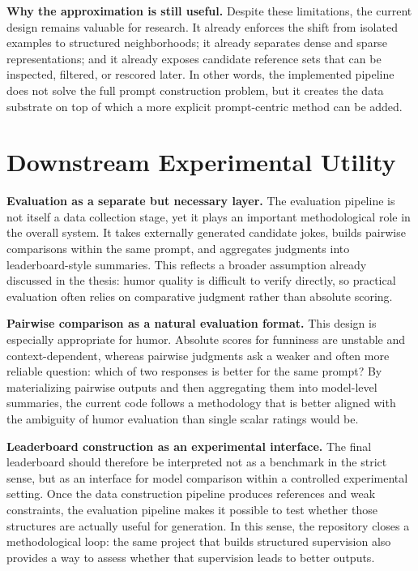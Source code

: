 \documentclass[12pt]{extarticle}
\begin{document}
\textbf{Why the approximation is still useful.} Despite these limitations, the current design remains valuable for research. It already enforces the shift from isolated examples to structured neighborhoods; it already separates dense and sparse representations; and it already exposes candidate reference sets that can be inspected, filtered, or rescored later. In other words, the implemented pipeline does not solve the full prompt construction problem, but it creates the data substrate on top of which a more explicit prompt-centric method can be added.

\section{Downstream Experimental Utility}

\textbf{Evaluation as a separate but necessary layer.} The evaluation pipeline is not itself a data collection stage, yet it plays an important methodological role in the overall system. It takes externally generated candidate jokes, builds pairwise comparisons within the same prompt, and aggregates judgments into leaderboard-style summaries. This reflects a broader assumption already discussed in the thesis: humor quality is difficult to verify directly, so practical evaluation often relies on comparative judgment rather than absolute scoring.

\textbf{Pairwise comparison as a natural evaluation format.} This design is especially appropriate for humor. Absolute scores for funniness are unstable and context-dependent, whereas pairwise judgments ask a weaker and often more reliable question: which of two responses is better for the same prompt? By materializing pairwise outputs and then aggregating them into model-level summaries, the current code follows a methodology that is better aligned with the ambiguity of humor evaluation than single scalar ratings would be.

\textbf{Leaderboard construction as an experimental interface.} The final leaderboard should therefore be interpreted not as a benchmark in the strict sense, but as an interface for model comparison within a controlled experimental setting. Once the data construction pipeline produces references and weak constraints, the evaluation pipeline makes it possible to test whether those structures are actually useful for generation. In this sense, the repository closes a methodological loop: the same project that builds structured supervision also provides a way to assess whether that supervision leads to better outputs.
\end{document}
